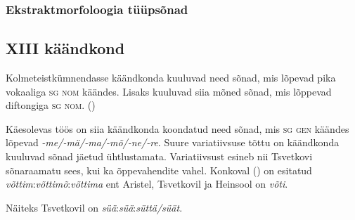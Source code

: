 \documentclass[12pt,a4paper]{article}
\newcommand{\vadja}[1]{\textit{#1}}
\newcommand{\msd}[1]{\textsc{#1}}
\begin{document}

\subsubsection*{Ekstraktmorfoloogia tüüpsõnad}
\vspace{-3.5em}








\subsection{\RN{13} käändkond}

Kolmeteistkümnendasse käändkonda kuuluvad need sõnad, mis lõpevad pika vokaaliga \msd{sg nom} käändes. Lisaks kuuluvad siia mõned sõnad, mis lõppevad diftongiga \msd{sg nom}. (\cite[49]{ariste_grammar_1968})

Käesolevas töös on siia käändkonda koondatud need sõnad, mis \msd{sg gen} käändes lõpevad \textit{-me/-mä/-ma/-mõ/-ne/-re}. Suure variatiivsuse tõttu on käändkonda kuuluvad sõnad jäetud ühtlustamata. Variatiivsust esineb nii Tsvetkovi sõnaraamatu sees, kui ka õppevahendite vahel. %
Konkoval (\citeyear{konkova_vaddceeli_2014}) on esitatud \textit{võttim}:\textit{võttimõ}:\textit{võttima} ent Aristel, Tsvetkovil ja Heinsool on \textit{võti}.

Näiteks Tsvetkovil on \textit{süä}:\textit{süä}:\textit{süttä/süät}.

\end{document}
